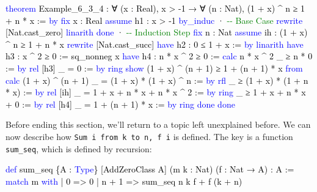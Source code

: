 \documentclass[
  letterpaper,
  DIV=11,
  numbers=noendperiod]{scrreprt}
\newenvironment{Shaded}{\begin{snugshade}}{\end{snugshade}}
\newcommand{\CommentTok}[1]{\textcolor[rgb]{0.37,0.37,0.37}{#1}}
\newcommand{\KeywordTok}[1]{\textcolor[rgb]{0.00,0.23,0.31}{#1}}
\newcommand{\NormalTok}[1]{\textcolor[rgb]{0.00,0.23,0.31}{#1}}
\renewcommand{\NormalTok}[1]{\textcolor[HTML]{000000}{#1}}
\renewcommand{\KeywordTok}[1]{\textcolor[HTML]{0000FF}{#1}}
\renewcommand{\CommentTok}[1]{\textcolor[HTML]{008000}{#1}}
\theoremstyle{remark}
\begin{document}
\begin{Shaded}
\begin{Highlighting}[]
\KeywordTok{theorem}\NormalTok{ Example\_6\_3\_4 : ∀ (x : Real), x \textgreater{} {-}1 →}
\NormalTok{    ∀ (n : Nat), (1 + x) \^{} n ≥ 1 + n * x := }\KeywordTok{by}
  \KeywordTok{fix}\NormalTok{ x : Real}
  \KeywordTok{assume}\NormalTok{ h1 : x \textgreater{} {-}1}
  \KeywordTok{by\_induc}
\NormalTok{  · }\CommentTok{{-}{-} Base Case}
    \KeywordTok{rewrite}\NormalTok{ [Nat.cast\_zero]}
    \KeywordTok{linarith}
    \KeywordTok{done}
\NormalTok{  · }\CommentTok{{-}{-} Induction Step}
    \KeywordTok{fix}\NormalTok{ n : Nat}
    \KeywordTok{assume}\NormalTok{ ih : (1 + x) \^{} n ≥ 1 + n * x}
    \KeywordTok{rewrite}\NormalTok{ [Nat.cast\_succ]}
    \KeywordTok{have}\NormalTok{ h2 : 0 ≤ 1 + x := }\KeywordTok{by} \KeywordTok{linarith}
    \KeywordTok{have}\NormalTok{ h3 : x \^{} 2 ≥ 0 := sq\_nonneg x}
    \KeywordTok{have}\NormalTok{ h4 : n * x \^{} 2 ≥ 0 :=}
      \KeywordTok{calc}\NormalTok{ n * x \^{} 2}
\NormalTok{        \_ ≥ n * 0 := }\KeywordTok{by} \KeywordTok{rel}\NormalTok{ [h3]}
\NormalTok{        \_ = 0 := }\KeywordTok{by} \KeywordTok{ring}
    \KeywordTok{show}\NormalTok{ (1 + x) \^{} (n + 1) ≥ 1 + (n + 1) * x }\KeywordTok{from}
      \KeywordTok{calc}\NormalTok{ (1 + x) \^{} (n + 1)}
\NormalTok{        \_ = (1 + x) * (1 + x) \^{} n := }\KeywordTok{by} \KeywordTok{rfl}
\NormalTok{        \_ ≥ (1 + x) * (1 + n * x) := }\KeywordTok{by} \KeywordTok{rel}\NormalTok{ [ih]}
\NormalTok{        \_ = 1 + x + n * x + n * x \^{} 2 := }\KeywordTok{by} \KeywordTok{ring}
\NormalTok{        \_ ≥ 1 + x + n * x + 0 := }\KeywordTok{by} \KeywordTok{rel}\NormalTok{ [h4]}
\NormalTok{        \_ = 1 + (n + 1) * x := }\KeywordTok{by} \KeywordTok{ring}
    \KeywordTok{done}
  \KeywordTok{done}
\end{Highlighting}
\end{Shaded}

Before ending this section, we'll return to a topic left unexplained
before. We can now describe how \texttt{Sum\ i\ from\ k\ to\ n,\ f\ i}
is defined. The key is a function \texttt{sum\_seq}, which is defined by
recursion:

\begin{Shaded}
\begin{Highlighting}[]
\KeywordTok{def}\NormalTok{ sum\_seq \{A : }\KeywordTok{Type}\NormalTok{\} [AddZeroClass A]}
\NormalTok{    (m k : Nat) (f : Nat → A) : A :=}
  \KeywordTok{match}\NormalTok{ m }\KeywordTok{with}
\NormalTok{    | 0 =\textgreater{} 0}
\NormalTok{    | n + 1 =\textgreater{} sum\_seq n k f + f (k + n)}
\end{Highlighting}
\end{Shaded}
\end{document}

